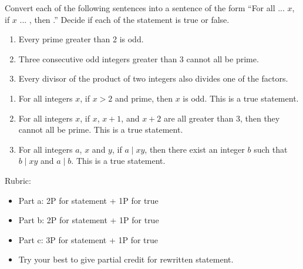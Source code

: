 \documentclass{article}
\theoremstyle{definition}
\begin{document}
\begin{question}
   Convert each of the following sentences into a sentence of the form ``For all ... $x$, if $x$ ... , then .'' Decide if each of the statement is true or false.
    \begin{enumerate}
        \item Every prime greater than 2 is odd.
        \item Three consecutive odd integers greater than 3 cannot all be prime.
        \item Every divisor of the product of two integers also divides one of the factors.
    \end{enumerate}
\end{question}
\begin{solution}
    \begin{enumerate}
        \item For all integers $x$, if $x>2$ and prime, then $x$ is odd. This is a true statement. 
        \item For all integers $x$, if $x$, $x+1$, and $x+2$ are all greater than 3, then they cannot all be prime. This is a true statement.
        \item For all integers $a$, $x$ and $y$, if $a \mid xy$, then there exist an integer $b$ such that $b \mid xy$ and $a \mid b$. This is a true statement.
    \end{enumerate}

{\color{red} Rubric:
\begin{itemize}
\item Part a: 2P for statement + 1P for true
\item Part b: 2P for statement + 1P for true
\item Part c: 3P for statement + 1P for true
\item Try your best to give partial credit for rewritten statement.
\end{itemize}}
\end{solution}
\end{document}
